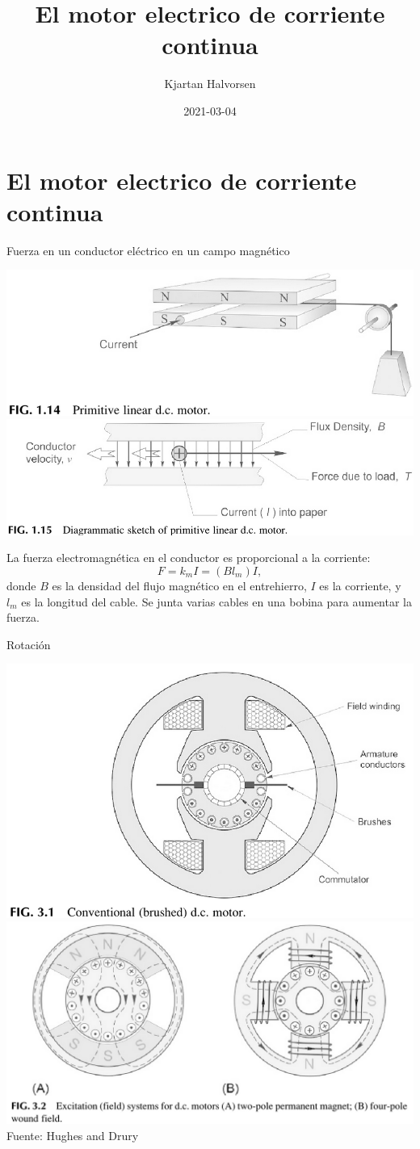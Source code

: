 \documentclass[presentation,aspectratio=169]{beamer}
\author{Kjartan Halvorsen}
\date{2021-03-04}
\title{El motor electrico de corriente continua}
\begin{document}
\maketitle

\section{El motor electrico de corriente continua}
\label{sec:org5f4cd9a}
\begin{frame}[label={sec:org058fce4}]{Fuerza en un conductor eléctrico en un campo magnético}
\begin{center}
\includegraphics[width=0.4\linewidth]{../../figures/HD-fig1_14.png}
\includegraphics[width=0.53\linewidth]{../../figures/HD-fig1_15.png}
\end{center}

La fuerza electromagnética en el conductor es \alert{proporcional a la corriente}:
\[F=k_mI=(Bl_m)I,\] donde \(B\) es la densidad del flujo magnético en el entrehierro, \(I\) es la corriente, y \(l_m\) es la longitud del cable. Se junta varias cables en una bobina para aumentar la fuerza.
\end{frame}

\begin{frame}[label={sec:org5fc7843}]{Rotación}
\begin{center}
\includegraphics[width=0.4\linewidth]{../../figures/HD-fig3_1.png}
\includegraphics[width=0.53\linewidth]{../../figures/HD-fig3_2.png}
{\footnotesize Fuente: Hughes and Drury}
\end{center}
\end{frame}
\end{document}
